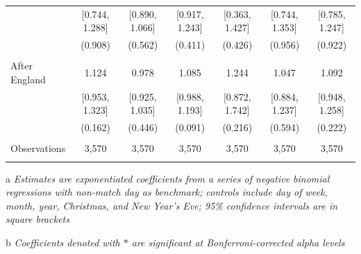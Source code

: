 \documentclass[12pt, a4paper]{article}
\begin{document}
\begin{table}
{\begin{threeparttable}
\begin{tabular}{@{\extracolsep{1pt}}lcccccc}
  & [0.744, 1.288] & [0.890, 1.066] & [0.917, 1.243] & [0.363, 1.427] & [0.744, 1.353] & [0.785, 1.247] \\ 
  & (0.908) & (0.562) & (0.411) & (0.426) & (0.956) & (0.922) \\ 
  & & & & & & \\ 
 After England & 1.124 & 0.978 & 1.085 & 1.244 & 1.047 & 1.092 \\ 
  & [0.953, 1.323] & [0.925, 1.035] & [0.988, 1.193] & [0.872, 1.742] & [0.884, 1.237] & [0.948, 1.258] \\ 
  & (0.162) & (0.446) & (0.091) & (0.216) & (0.594) & (0.222) \\ 


\hline \\[-1.8ex] 
Observations & 3,570 & 3,570 & 3,570 & 3,570 & 3,570 & 3,570 \\ 
\hline 
\hline \\[-1.8ex] 
\end{tabular} 
\begin{tablenotes}
      \item[a] \textit{Estimates are exponentiated coefficients from a series of negative binomial regressions with non-match day as benchmark; controls include day of week, month, year, Christmas, and New Year's Eve; 95\% confidence intervals are in square brackets}
       \item[b] \textit{Coefficients denoted with $*$ are significant at Bonferroni-corrected alpha levels}
    \end{tablenotes}
\end{threeparttable} }
\end{table}
\end{document}

